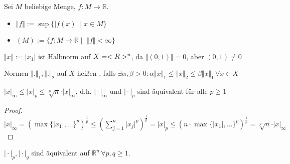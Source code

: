\begin{example}
	Sei $M$ beliebige Menge, $f:M\rightarrow \mathbb{R}$.
	\begin{itemize}
		\item $\Vert f \Vert :=\sup\{ \vert f(x)\vert \mid x\in M\}$ 
		\item {}$(M):=\{ f:M\rightarrow \mathbb{R} \mid\; \Vert f \Vert < \infty \}$ 
	\end{itemize}
\end{example}

\begin{example}
	$\Vert x\Vert:=\vert x_1\vert$ ist Halbnorm auf $X=<R>^n$, da $\Vert(0,1)\Vert=0$, aber $(0,1)\neq 0$
\end{example}

\begin{*definition}
	Normen $\Vert .\Vert_1, \Vert .\Vert_2$ auf $X$ heißen , falls $\exists \alpha,\beta > 0:\alpha \Vert x \Vert_1 \le \Vert x\Vert_2 \le \beta \Vert x\Vert_1 \,\forall x\in X$
\end{*definition}

\begin{example}
	$\vert x \vert_\infty \le \vert x\vert_p \le \sqrt[p]{n}\cdot\vert x\vert_\infty$, d.h. $\vert\cdot\vert_\infty$ und $\vert\cdot\vert_p$ sind äquivalent für alle $p\ge 1$
\end{example}
\begin{proof}
	$\vert x\vert_\infty=(\max\{\vert x_1\vert,...\}^p)^{\frac{1}{p}}\le \left(\sum_{j=1}^n \vert x_j\vert^p \right)^{\frac{1}{p}}=\vert x\vert_p\le (n\cdot\max\{\vert x_1\vert,...\}^p)^{\frac{1}{p}}=\sqrt[p]{n}\cdot \vert x\vert_\infty$
\end{proof}

\begin{conclusion}
	$\vert\cdot\vert_p, \vert\cdot\vert_q$ sind äquivalent auf $\mathbb{R}^n\,\forall p,q\ge 1$.
\end{conclusion}

